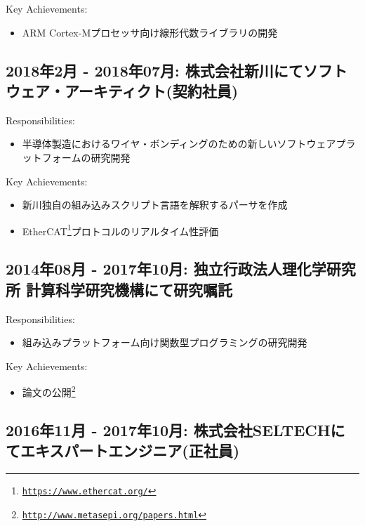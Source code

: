 \documentclass[letterpaper]{article}
\begin{document}
\noindent Key Achievements:

\begin{itemize}
  \item ARM Cortex-Mプロセッサ向け線形代数ライブラリの開発
\end{itemize}

\subsection*{2018年2月 - 2018年07月: 株式会社新川にてソフトウェア・アーキティクト(契約社員)}

\noindent Responsibilities:

\begin{itemize}
  \item 半導体製造におけるワイヤ・ボンディングのための新しいソフトウェアプラットフォームの研究開発
\end{itemize}

\noindent Key Achievements:

\begin{itemize}
  \item 新川独自の組み込みスクリプト言語を解釈するパーサを作成
  \item EtherCAT\footnote{\href{https://www.ethercat.org/}{\tt https://www.ethercat.org/}}プロトコルのリアルタイム性評価
\end{itemize}

\subsection*{2014年08月 - 2017年10月: 独立行政法人理化学研究所 計算科学研究機構にて研究嘱託}

\noindent Responsibilities:

\begin{itemize}
  \item 組み込みプラットフォーム向け関数型プログラミングの研究開発
\end{itemize}

\noindent Key Achievements:

\begin{itemize}
  \item 論文の公開\footnote{\href{http://www.metasepi.org/papers.html}{\tt http://www.metasepi.org/papers.html}}
\end{itemize}

\subsection*{2016年11月 - 2017年10月: 株式会社SELTECHにてエキスパートエンジニア(正社員)}
\end{document}
